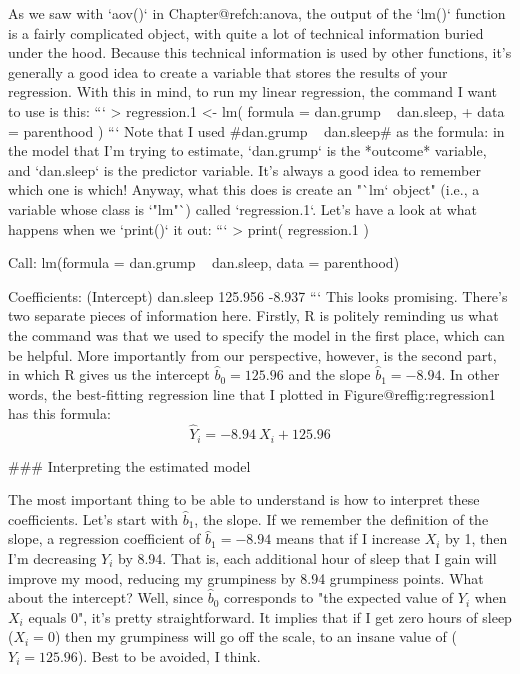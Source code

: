 As we saw with `aov()` in Chapter@refch:anova, the output of the `lm()` function is a fairly complicated object, with quite a lot of technical information buried under the hood. Because this technical information is used by other functions, it's generally a good idea to create a variable that stores the results of your regression. With this in mind, to run my linear regression, the command I want to use is this:
```
> regression.1 <- lm( formula = dan.grump ~ dan.sleep,  
+                     data = parenthood )  
```
Note that I used \rtextverb#dan.grump ~ dan.sleep# as the formula: in the model that I'm trying to estimate, `dan.grump` is the *outcome* variable, and `dan.sleep` is the predictor variable. It's always a good idea to remember which one is which! Anyway, what this does is create an "`lm` object" (i.e., a variable whose class is `"lm"`) called `regression.1`. Let's have a look at what happens when we `print()` it out:
```
> print( regression.1 )

Call:
lm(formula = dan.grump ~ dan.sleep, data = parenthood)

Coefficients:
(Intercept)    dan.sleep  
    125.956       -8.937  
```
This looks promising. There's two separate pieces of information here. Firstly, R is politely reminding us what the command was that we used to specify the model in the first place, which can be helpful. More importantly from our perspective, however, is the second part, in which R gives us the intercept $\hat{b}_0 = 125.96$ and the slope $\hat{b}_1 = -8.94$. In other words, the best-fitting regression line that I plotted in Figure@reffig:regression1 has this formula:
$$
\hat{Y}_i = -8.94 \ X_i + 125.96
$$ 

### Interpreting the estimated model

The most important thing to be able to understand is how to interpret these coefficients. Let's start with $\hat{b}_1$, the slope. If we remember the definition of the slope, a regression coefficient of $\hat{b}_1 = -8.94$ means that if I increase $X_i$ by 1, then I'm decreasing $Y_i$ by 8.94. That is, each additional hour of sleep that I gain will improve my mood, reducing my grumpiness by 8.94 grumpiness points. What about the intercept? Well, since $\hat{b}_0$ corresponds to "the expected value of $Y_i$ when $X_i$ equals 0", it's pretty straightforward. It implies that if I get zero hours of sleep ($X_i =0$) then my grumpiness will go off the scale, to an insane value of ($Y_i = 125.96$). Best to be avoided, I think.



